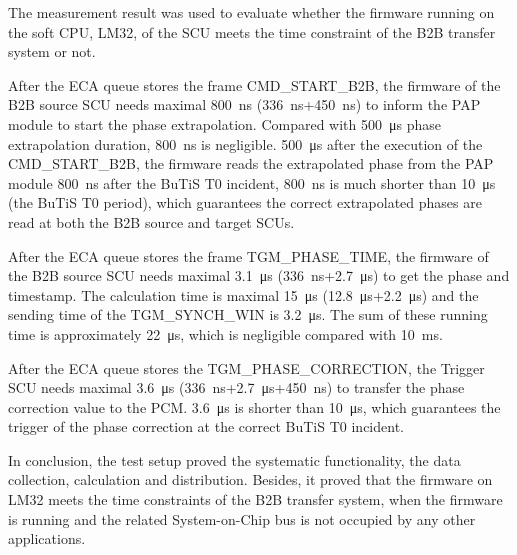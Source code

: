 The measurement result was used to evaluate whether the firmware running on the soft CPU, LM32, of the SCU meets the time constraint of the B2B transfer system or not.

After the ECA queue stores the frame CMD\_START\_B2B, the firmware of the B2B source SCU needs maximal \SI{800}{\ns} (\SI{336}{\ns}+\SI{450}{\ns}) to inform the PAP module to start the phase extrapolation. Compared with \SI{500}{\us} phase extrapolation duration,  \SI{800}{\ns} is negligible. \SI{500}{\us} after the execution of the CMD\_START\_B2B, the firmware reads the extrapolated phase from the PAP module \SI{800}{\ns} after the BuTiS T0 incident, \SI{800}{\ns} is much shorter than \SI{10}{\us} (the BuTiS T0 period), which guarantees the correct extrapolated phases are read at both the B2B source and target SCUs. 

After the ECA queue stores the frame TGM\_PHASE\_TIME, the firmware of the B2B source SCU needs maximal \SI{3.1}{\us} (\SI{336}{\ns}+\SI{2.7}{\us}) to get the phase and timestamp. The calculation time is maximal \SI{15}{\us} (\SI{12.8}{\us}+\SI{2.2}{\us}) and the sending time of the TGM\_SYNCH\_WIN is \SI{3.2}{\us}. The sum of these running time is approximately \SI{22}{\us}, which is negligible compared with \SI{10}{\ms}.

After the ECA queue stores the TGM\_PHASE\_CORRECTION, the Trigger SCU needs maximal \SI{3.6}{\us} (\SI{336}{\ns}+\SI{2.7}{\us}+\SI{450}{\ns}) to transfer the phase correction value to the PCM. \SI{3.6}{\us} is shorter than \SI{10}{\us}, which guarantees the trigger of the phase correction at the correct BuTiS T0 incident.

In conclusion, the test setup proved the systematic functionality, the data collection, calculation and distribution. Besides, it proved that the firmware on LM32 meets the time constraints of the B2B transfer system, when the firmware is running and the related System-on-Chip bus is not occupied by any other applications. 






